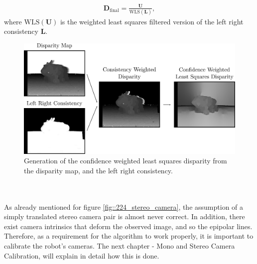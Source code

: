 \begin{align}
	\bm{D}_\text{final} = \frac{\bm{U}}{\text{WLS}(\bm{L})},
	\label{eq::224_wls_final}
\end{align}
where $\text{WLS}(\bm{U})$ is the weighted least squares filtered version of the left right consistency $\bm{L}$.
\begin{figure}[h!]
	\centering
	\includegraphics[scale=.28]{chapters/02_background/img/weighted_least_squares_disparity.png}
	\caption{Generation of the confidence weighted least squares disparity from the disparity map, and the left right consistency.}
	\label{fig::224_weighted_least_squares_disparity}
\end{figure}
\\\\
As already mentioned for figure \ref{fig::224_stereo_camera}, the assumption of a simply translated stereo camera pair is almost never correct. In addition, there exist camera intrinsics that deform the observed image, and so the epipolar lines. Therefore, as a requirement for the algorithm to work properly, it is important to calibrate the robot's cameras. The next chapter - Mono and Stereo Camera Calibration, will explain in detail how this is done.
\FloatBarrier
